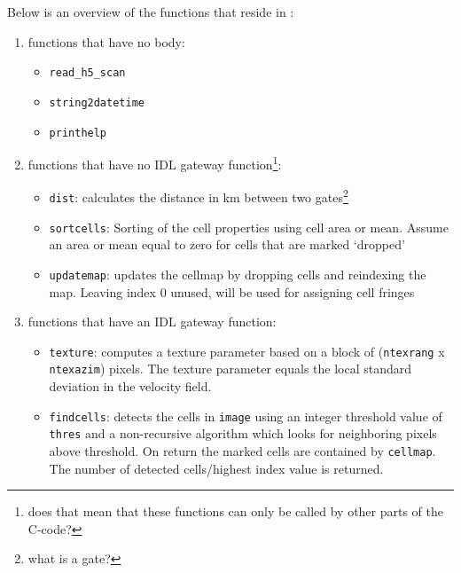 Below is an overview of the functions that reside in :
\begin{enumerate}

\item{functions that have no body:}
\begin{itemize}
\item{\texttt{read\_h5\_scan}}
\item{\texttt{string2datetime}}
\item{\texttt{printhelp}}
\end{itemize}

\item{functions that have no IDL gateway function\footnote{does that mean that these functions can only be called by other parts of the C-code?}:}

\begin{itemize}

\item{\texttt{dist}: calculates the distance in km between two gates\footnote{what is a gate?} }

\item{\texttt{sortcells}: Sorting of the cell properties using cell area or mean. Assume an area or mean equal to zero for cells that are marked `dropped' }

\item{\texttt{updatemap}: updates the cellmap by dropping cells and reindexing the map. Leaving index 0 unused, will be used for assigning cell fringes }

\end{itemize}

\item{functions that have an IDL gateway function:}

\begin{itemize}

\item{\texttt{texture}: computes a texture parameter based on a block of (\texttt{ntexrang} x \texttt{ntexazim}) pixels. The texture parameter equals the local standard deviation in the velocity field.}

\item{\texttt{findcells}: detects the cells in \texttt{image} using an integer threshold value of \texttt{thres} and a non-recursive algorithm which looks for neighboring pixels above threshold. On return the marked cells are contained by \texttt{cellmap}. The number of detected cells/highest
index value is returned.}


\end{itemize}
\end{enumerate}
